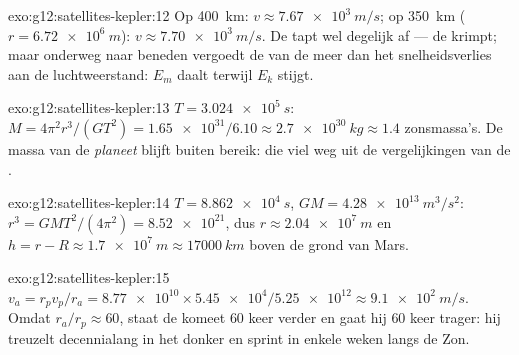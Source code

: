 \begin{solution}{exo:g12:satellites-kepler:12}
Op \qty{400}{km}: $v \approx \qty{7.67e3}{m/s}$; op \qty{350}{km}
($r = \qty{6.72e6}{m}$): $v \approx \qty{7.70e3}{m/s}$. De  tapt wel
degelijk  af --- de  krimpt; maar onderweg naar
beneden vergoedt de  van de  meer dan het snelheidsverlies
aan de luchtweerstand: $E_m$ daalt terwijl $E_k$ stijgt.
\end{solution}

\begin{solution}{exo:g12:satellites-kepler:13}
$T = \qty{3.024e5}{s}$: $M = 4\pi^2 r^3/(GT^2) = \num{1.65e31}/6.10 \approx
\qty{2.7e30}{kg} \approx 1.4$ zonsmassa's. De massa van de \emph{planeet}
blijft buiten bereik: die viel weg uit de vergelijkingen van de .
\end{solution}

\begin{solution}{exo:g12:satellites-kepler:14}
$T = \qty{8.862e4}{s}$, $GM = \qty{4.28e13}{m^3/s^2}$:
$r^3 = GMT^2/(4\pi^2) = \num{8.52e21}$, dus $r \approx \qty{2.04e7}{m}$ en
$h = r - R \approx \qty{1.7e7}{m} \approx \qty{17000}{km}$ boven de grond
van Mars.
\end{solution}

\begin{solution}{exo:g12:satellites-kepler:15}
$v_a = r_p v_p / r_a = \num{8.77e10} \times \num{5.45e4} / \num{5.25e12}
\approx \qty{9.1e2}{m/s}$. Omdat $r_a/r_p \approx 60$, staat de komeet $60$
keer verder en gaat hij $60$ keer trager: hij treuzelt decennialang in het
donker en sprint in enkele weken langs de Zon.
\end{solution}

